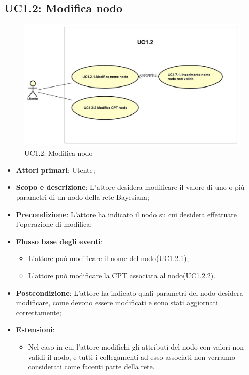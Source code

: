 \subsection{UC1.2: Modifica nodo} 
\hypertarget{UC1.2}{} 
\begin{figure} [H]
	\centering
	\includegraphics[scale=0.45]{Img/UC1-2} 
	\caption{UC1.2: Modifica nodo} \label{} 
\end{figure} 
\begin{itemize} 
	\item{\textbf{Attori primari}: Utente;} 
	\item{\textbf{Scopo e descrizione}: L'attore desidera modificare il valore di uno o più parametri di un nodo della rete Bayesiana;} 
	\item{\textbf{Precondizione}: L'attore ha indicato il nodo su cui desidera effettuare l'operazione di modifica;} 
	\item{\textbf{Flusso base degli eventi}: } 
	\begin{itemize} 
		\item{L'attore può modificare il nome del nodo(UC1.2.1);} 
		\item{L'attore può modificare la CPT associata al nodo(UC1.2.2).} 		
	\end{itemize} 
	\item{\textbf{Postcondizione}: L'attore ha indicato quali parametri del nodo desidera modificare, come devono essere modificati e sono stati aggiornati correttamente;} 
	\item{\textbf{Estensioni}:} 
	\begin{itemize} 
		\item{Nel caso in cui l'attore modifichi gli attributi del nodo con valori non validi il nodo, e tutti i collegamenti ad esso associati non verranno considerati come facenti parte della rete.} 
	\end{itemize} 
\end{itemize} 
